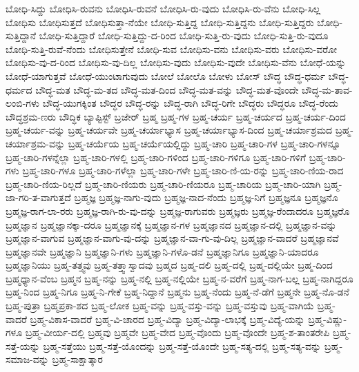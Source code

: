{ಬೋಧಿ-ಸಿದ್ದು
ಬೋಧಿಸಿ-ರುವನು
ಬೋಧಿಸಿ-ರುವನೆ
ಬೋಧಿಸಿ-ರು-ವುದು
ಬೋಧಿಸಿ-ರು-ವೆನು
ಬೋಧಿ-ಸಿಲ್ಲ
ಬೋಧಿಸು
ಬೋಧಿಸುತ್ತದೆ
ಬೋಧಿಸುತ್ತಾ-ನೆಯೇ
ಬೋಧಿ-ಸುತ್ತಿದ್ದ
ಬೋಧಿ-ಸುತ್ತಿದ್ದನು
ಬೋಧಿ-ಸುತ್ತಿದ್ದರು
ಬೋಧಿ-ಸುತ್ತಿದ್ದಾನೆ
ಬೋಧಿ-ಸುತ್ತಿದ್ದಾರೆ
ಬೋಧಿ-ಸುತ್ತಿದ್ದು-ದ-ರಿಂದ
ಬೋಧಿ-ಸುತ್ತಿ-ರು-ವುದು
ಬೋಧಿ-ಸುತ್ತಿ-ರು-ವುದೂ
ಬೋಧಿ-ಸುತ್ತಿ-ರುವೆ-ನೆಂದು
ಬೋಧಿಸುತ್ತೇನೆ
ಬೋಧಿ-ಸುವ
ಬೋಧಿಸು-ವನು
ಬೋಧಿಸು-ವರು
ಬೋಧಿಸು-ವರೋ
ಬೋಧಿಸು-ವು-ದ-ರಿಂದ
ಬೋಧಿಸು-ವು-ದಿಲ್ಲ
ಬೋಧಿಸು-ವುದು
ಬೋಧಿಸು-ವುದೇ
ಬೋಧಿಸು-ವೆನು
ಬೋಧೆ-ಯನ್ನು
ಬೋಧೆ-ಯಾಗುತ್ತವೆ
ಬೋಧೆ-ಯುಂಟಾಗುವುದು
ಬೋಲೆ
ಬೋಲೊ
ಬೋಳು
ಬೋಸ್
ಬೌದ್ಧ
ಬೌದ್ಧ-ಧರ್ಮ
ಬೌದ್ಧ-ಧರ್ಮದ
ಬೌದ್ಧ-ಮತ
ಬೌದ್ಧ-ಮ-ತದ
ಬೌದ್ಧ-ಮತ-ದಿಂದ
ಬೌದ್ಧ-ಮತ-ವನ್ನು
ಬೌದ್ಧ-ಮತ-ವೊಂದೇ
ಬೌದ್ಧ-ಮ-ತಾವ-ಲಂಬಿ-ಗಳು
ಬೌದ್ಧ-ಯುಗಕ್ಕಿಂತ
ಬೌದ್ಧರ
ಬೌದ್ಧ-ರನ್ನು
ಬೌದ್ಧ-ರಾಗಿ
ಬೌದ್ಧ-ರಿಗೇ
ಬೌದ್ಧರು
ಬೌದ್ಧರೂ
ಬೌದ್ಧ-ರೆಂದು
ಬೌದ್ಧಶ್ರಮ-ಣರು
ಬೌದ್ಧಿಕ
ಬ್ಯಾಪ್ಟಿಸ್ಟ್
ಬ್ರಜೇರ್
ಬ್ರಹ್ಮ
ಬ್ರಹ್ಮ-ಗಳ
ಬ್ರಹ್ಮ-ಚರ್ಯ
ಬ್ರಹ್ಮ-ಚರ್ಯದ
ಬ್ರಹ್ಮ-ಚರ್ಯ-ದಿಂದ
ಬ್ರಹ್ಮ-ಚರ್ಯ-ವನ್ನು
ಬ್ರಹ್ಮ-ಚರ್ಯವೇ
ಬ್ರಹ್ಮ-ಚರ್ಯಾಭ್ಯಾಸ
ಬ್ರಹ್ಮ-ಚರ್ಯಾಭ್ಯಾಸ-ದಿಂದ
ಬ್ರಹ್ಮ-ಚರ್ಯಾಶ್ರಮದ
ಬ್ರಹ್ಮ-ಚರ್ಯಾಶ್ರಮ-ವನ್ನು
ಬ್ರಹ್ಮ-ಚರ್ಯೆಯ
ಬ್ರಹ್ಮ-ಚರ್ಯೆಯಲ್ಲಿದ್ದು
ಬ್ರಹ್ಮ-ಚಾರಿ
ಬ್ರಹ್ಮ-ಚಾರಿ-ಗಳ
ಬ್ರಹ್ಮ-ಚಾರಿ-ಗಳನ್ನೂ
ಬ್ರಹ್ಮ-ಚಾರಿ-ಗಳನ್ನೆಲ್ಲಾ
ಬ್ರಹ್ಮ-ಚಾರಿ-ಗಳಲ್ಲಿ
ಬ್ರಹ್ಮ-ಚಾರಿ-ಗಳಿಂದ
ಬ್ರಹ್ಮ-ಚಾರಿ-ಗಳಿಗೂ
ಬ್ರಹ್ಮ-ಚಾರಿ-ಗಳಿಗೆ
ಬ್ರಹ್ಮ-ಚಾರಿ-ಗಳು
ಬ್ರಹ್ಮ-ಚಾರಿ-ಗಳೂ
ಬ್ರಹ್ಮ-ಚಾರಿ-ಗಳೆಲ್ಲಾ
ಬ್ರಹ್ಮ-ಚಾರಿ-ಗಳೇ
ಬ್ರಹ್ಮ-ಚಾರಿ-ಣಿ-ಯ-ರನ್ನು
ಬ್ರಹ್ಮ-ಚಾರಿ-ಣಿಯ-ರಾದ
ಬ್ರಹ್ಮ-ಚಾರಿ-ಣಿಯ-ರಿಲ್ಲದೆ
ಬ್ರಹ್ಮ-ಚಾರಿ-ಣಿಯರು
ಬ್ರಹ್ಮ-ಚಾರಿ-ಣಿಯರೂ
ಬ್ರಹ್ಮ-ಚಾರಿಯ
ಬ್ರಹ್ಮ-ಚಾರಿ-ಯಾಗಿ
ಬ್ರಹ್ಮ-ಜಾ-ಗರಿ-ತ-ವಾಗುತ್ತದೆ
ಬ್ರಹ್ಮಜ್ಞ
ಬ್ರಹ್ಮಜ್ಞ-ನಾಗು-ವುದು
ಬ್ರಹ್ಮಜ್ಞ-ನಾದ-ನೆಂದು
ಬ್ರಹ್ಮಜ್ಞ-ನಿಗೆ
ಬ್ರಹ್ಮಜ್ಞನೂ
ಬ್ರಹ್ಮಜ್ಞನೊ
ಬ್ರಹ್ಮಜ್ಞ-ರಾಗ-ಲಾ-ರರು
ಬ್ರಹ್ಮಜ್ಞ-ರಾಗಿ-ರು-ವು-ದನ್ನು
ಬ್ರಹ್ಮಜ್ಞ-ರಾಗುವರು
ಬ್ರಹ್ಮಜ್ಞರು
ಬ್ರಹ್ಮಜ್ಞ-ರೆಂದಾದರೂ
ಬ್ರಹ್ಮಜ್ಞರೊ
ಬ್ರಹ್ಮಜ್ಞಾನ
ಬ್ರಹ್ಮಜ್ಞಾನಕ್ಕಾ-ದರೂ
ಬ್ರಹ್ಮಜ್ಞಾನಕ್ಕೆ
ಬ್ರಹ್ಮಜ್ಞಾನ-ಗಳ
ಬ್ರಹ್ಮಜ್ಞಾನದ
ಬ್ರಹ್ಮಜ್ಞಾನ-ದಲ್ಲಿ
ಬ್ರಹ್ಮಜ್ಞಾನ-ವನ್ನು
ಬ್ರಹ್ಮಜ್ಞಾನ-ವಾಗುವ
ಬ್ರಹ್ಮಜ್ಞಾನ-ವಾಗು-ವು-ದನ್ನು
ಬ್ರಹ್ಮಜ್ಞಾನ-ವಾ-ಗು-ವು-ದಿಲ್ಲ
ಬ್ರಹ್ಮಜ್ಞಾನ-ವಾದರೆ
ಬ್ರಹ್ಮಜ್ಞಾನವೆ
ಬ್ರಹ್ಮಜ್ಞಾನವೇ
ಬ್ರಹ್ಮಜ್ಞಾನಿ
ಬ್ರಹ್ಮಜ್ಞಾನಿ-ಗಳು
ಬ್ರಹ್ಮಜ್ಞಾನಿ-ಗಳೊ-ಡನೆ
ಬ್ರಹ್ಮಜ್ಞಾನಿಗೂ
ಬ್ರಹ್ಮಜ್ಞಾನಿ-ಯಾದರೂ
ಬ್ರಹ್ಮಜ್ಞಾನಿಯು
ಬ್ರಹ್ಮ-ತತ್ತ್ವವು
ಬ್ರಹ್ಮ-ತತ್ತ್ವಾಸ್ವಾದವು
ಬ್ರಹ್ಮದ
ಬ್ರಹ್ಮ-ದಲಿ
ಬ್ರಹ್ಮ-ದಲ್ಲಿ
ಬ್ರಹ್ಮ-ದಲ್ಲಿಯೇ
ಬ್ರಹ್ಮ-ದಿಂದ
ಬ್ರಹ್ಮಧ್ಯಾನ-ವೆಂಬ
ಬ್ರಹ್ಮನ
ಬ್ರಹ್ಮ-ನನ್ನು
ಬ್ರಹ್ಮ-ನಲ್ಲಿ
ಬ್ರಹ್ಮ-ನಲ್ಲಿಯೇ
ಬ್ರಹ್ಮ-ನ-ವರೆಗೆ
ಬ್ರಹ್ಮ-ನಾಗ-ಬಲ್ಲ
ಬ್ರಹ್ಮ-ನಾಗಿದ್ದರೂ
ಬ್ರಹ್ಮ-ನಿಂದ
ಬ್ರಹ್ಮ-ನಿಗೂ
ಬ್ರಹ್ಮ-ನಿ-ಗೇಕೆ
ಬ್ರಹ್ಮ-ನಿದ್ದಾನೆ
ಬ್ರಹ್ಮನು
ಬ್ರಹ್ಮ-ನೆಂದು
ಬ್ರಹ್ಮ-ನೆ-ಡೆಗೆ
ಬ್ರಹ್ಮನೇ
ಬ್ರಹ್ಮ-ನೊ-ಡನೆ
ಬ್ರಹ್ಮ-ಪುತ್ರಾ
ಬ್ರಹ್ಮಪ್ರಕಾ-ಶದ
ಬ್ರಹ್ಮ-ಲೋಕ
ಬ್ರಹ್ಮ-ವನ್ನು
ಬ್ರಹ್ಮ-ವಸ್ತು-ವನ್ನು
ಬ್ರಹ್ಮ-ವಸ್ತುವು
ಬ್ರಹ್ಮ-ವಾಗಿಯೆ
ಬ್ರಹ್ಮ-ವಾದರೆ
ಬ್ರಹ್ಮ-ವಿಕಾಸ-ವಾದರೆ
ಬ್ರಹ್ಮ-ವಿ-ಚಾರದ
ಬ್ರಹ್ಮ-ವಿದ್ಯಾ
ಬ್ರಹ್ಮ-ವಿದ್ಯಾ-ಲಾಭಕ್ಕೆ
ಬ್ರಹ್ಮ-ವಿದ್ಯೆ-ಯನ್ನು
ಬ್ರಹ್ಮ-ವಿಷ್ಣು-ಗಳೂ
ಬ್ರಹ್ಮ-ವೀರ್ಯ-ದಲ್ಲಿ
ಬ್ರಹ್ಮವು
ಬ್ರಹ್ಮವೇ
ಬ್ರಹ್ಮ-ವೇದ
ಬ್ರಹ್ಮ-ವೊಂದು
ಬ್ರಹ್ಮ-ವೊಂದೇ
ಬ್ರಹ್ಮ-ಶ-ತಾಂತರೇಪಿ
ಬ್ರಹ್ಮ-ಸತ್ತೆ-ಯನ್ನು
ಬ್ರಹ್ಮ-ಸತ್ತೆಯು
ಬ್ರಹ್ಮ-ಸತ್ತೆ-ಯೊಂದನ್ನು
ಬ್ರಹ್ಮ-ಸತ್ತೆ-ಯೊಂದೇ
ಬ್ರಹ್ಮ-ಸತ್ಯ-ದಲ್ಲಿ
ಬ್ರಹ್ಮ-ಸತ್ಯ-ವನ್ನು
ಬ್ರಹ್ಮ-ಸಮಾಜ-ವನ್ನು
ಬ್ರಹ್ಮ-ಸಾಕ್ಷಾತ್ಕಾರ
}

